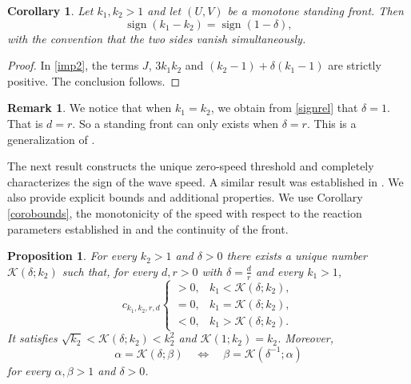 \documentclass[11pt]{article}
\DeclareMathOperator{\sign}{sign}
\numberwithin{equation}{section}
\newcommand{\1}{\mathbbm{1}}
\numberwithin{equation}{section}
\newtheorem{proposition}[theorem]{Proposition}
\newtheorem{corollary}[theorem]{Corollary}
\theoremstyle{definition}
\newtheorem{remark}[theorem]{Remark}
\def \K {\mathcal{K}}
\numberwithin{equation}{section}
\begin{document}
\begin{corollary}\label{corollarysign}
	Let $k_1,k_2>1$ and let $(U,V)$ be a monotone standing front. Then
	\begin{equation}\label{signrel}
		\sign(k_1-k_2)=\sign(1-\delta),
	\end{equation}
	with the convention that the two sides vanish simultaneously.
\end{corollary}

\begin{proof}
	In \eqref{imp2}, the terms $J$, $3k_1k_2$ and $(k_2-1)+\delta(k_1-1)$ are strictly positive. The conclusion follows.
\end{proof}
\begin{remark}\label{remarksiha}
We notice that when $k_1=k_2$, we obtain from \eqref{signrel} that $\delta=1$. That is $d=r$. So a standing front can only exists when $\delta=r$. This is a generalization of \cite[Theorem 4.1]{kenne2026}. 
\end{remark}

The next result constructs the unique zero-speed threshold and completely characterizes the sign of the wave speed. A similar result was established in \cite[Theorem 6.1]{nakamura2026}. We also provide explicit bounds and additional properties.  We use Corollary \ref{corobounds}, the monotonicity of the speed with respect to the reaction parameters established in \cite{kan1995} and the continuity of the front.
\begin{proposition}\label{propthreshold}
	For every $k_2>1$ and $\delta>0$ there exists a unique number $\K(\delta;k_2)$ such that, for
	every $d,r>0$ with $\delta=\frac{d}{r}$ and every $k_1>1$,
	\begin{equation}\label{signK00}
		c_{k_1,k_2,r,d}\begin{cases}
			>0,&k_1<\K(\delta;k_2),\\
			=0,&k_1=\K(\delta;k_2),\\
			<0,&k_1>\K(\delta;k_2).
		\end{cases}
	\end{equation}
	It satisfies $\sqrt{k_2}<\K(\delta;k_2)<k_2^2$ and
	$\mathcal K(1;k_2)=k_2$. Moreover,
	\begin{equation}\label{Kexchange}
		\alpha=\K(\delta;\beta)\quad\Longleftrightarrow\quad
		\beta=\K(\delta^{-1};\alpha)
	\end{equation}
	for every $\alpha,\beta>1$ and $\delta>0$.
\end{proposition}
\end{document}
